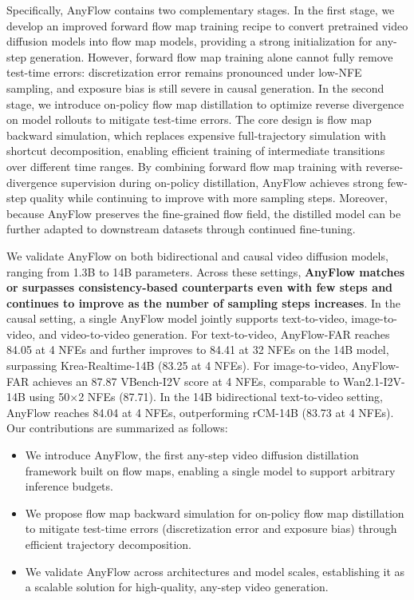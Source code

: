 Specifically, AnyFlow contains two complementary stages. In the first stage, we develop an improved forward flow map training recipe to convert pretrained video diffusion models into flow map models, providing a strong initialization for any-step generation. However, forward flow map training alone cannot fully remove test-time errors: discretization error remains pronounced under low-NFE sampling, and exposure bias is still severe in causal generation. In the second stage, we introduce on-policy flow map distillation to optimize reverse divergence on model rollouts to mitigate test-time errors. The core design is flow map backward simulation, which replaces expensive full-trajectory simulation with shortcut decomposition, enabling efficient training of intermediate transitions over different time ranges. By combining forward flow map training with reverse-divergence supervision during on-policy distillation, AnyFlow achieves strong few-step quality while continuing to improve with more sampling steps. Moreover, because AnyFlow preserves the fine-grained flow field, the distilled model can be further adapted to downstream datasets through continued fine-tuning.



We validate AnyFlow on both bidirectional and causal video diffusion models, ranging from 1.3B to 14B parameters. Across these settings, \textbf{AnyFlow matches or surpasses consistency-based counterparts even with few steps and continues to improve as the number of sampling steps increases}. In the causal setting, a single AnyFlow model jointly supports text-to-video, image-to-video, and video-to-video generation. For text-to-video, AnyFlow-FAR reaches 84.05 at 4 NFEs and further improves to 84.41 at 32 NFEs on the 14B model, surpassing Krea-Realtime-14B (83.25 at 4 NFEs). For image-to-video, AnyFlow-FAR achieves an 87.87 VBench-I2V score at 4 NFEs, comparable to Wan2.1-I2V-14B using 50$\times$2 NFEs (87.71). In the 14B bidirectional text-to-video setting, AnyFlow reaches 84.04 at 4 NFEs, outperforming rCM-14B (83.73 at 4 NFEs). Our contributions are summarized as follows:
\begin{itemize}
    \item We introduce AnyFlow, the first any-step video diffusion distillation framework built on flow maps, enabling a single model to support arbitrary inference budgets.
    \item We propose flow map backward simulation for on-policy flow map distillation to mitigate test-time errors (\ie discretization error and exposure bias) through efficient trajectory decomposition.
    \item We validate AnyFlow across architectures and model scales, establishing it as a scalable solution for high-quality, any-step video generation.
\end{itemize}
